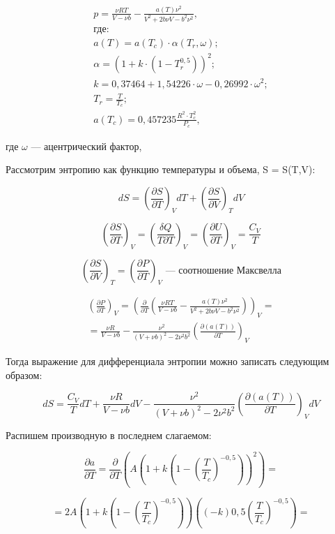 \documentclass[a4paper,14pt]{article}
\theoremstyle{plain} %
\theoremstyle{definition} %
\theoremstyle{remark} %
\begin{document}
\begin{gather*}
	p = \frac{\nu R T}{V - \nu b} - \frac{a(T) \nu^2}{V^2 + 2 b \nu V - b^2 \nu^2}, \\
	\textrm{где:} \\
	a(T) = a (T_c) \cdot \alpha(T_r, \omega);\\
	\alpha = (1 + k \cdot (1 - T_r^{0,5}))^2;\\
	k = 0,37464 + 1,54226 \cdot \omega - 0,26992 \cdot \omega^2;\\
	T_r = \frac{T}{T_c};\\
	a(T_c) = 0,457235 \frac{R^2 \cdot T_c^2}{P_c},
\end{gather*}

где $\omega$ --- ацентрический фактор, 

Рассмотрим энтропию как функцию температуры и объема,  S = S(T,V):

$$ d S = \left(\frac{\partial S}{\partial T}\right)_V d T + \left(\frac{\partial S}{\partial V}\right)_T d V $$

$$ \left(\frac{\partial S}{\partial T}\right)_V = \left(\frac{\delta Q}{T \partial T}\right)_V = \left(\frac{\partial U}{\partial T}\right)_V = \frac{C_V}{T} $$

$$ \left(\frac{\partial S}{\partial V}\right)_T = \left(\frac{\partial P}{\partial T}\right)_V \textrm{ --- соотношение Максвелла} $$

\begin{gather*}
\left(\frac{\partial P}{\partial T}\right)_V = \left(\frac{\partial}{\partial T}\left(\frac{\nu R T}{V - \nu b} - \frac{a(T) \nu^2}{V^2 + 2 b \nu V - b^2 \nu^2}\right)\right)_V = \\
= \frac{\nu R}{V - \nu b} - \frac{\nu^2}{(V + \nu b)^2 - 2 \nu^2 b^2} \left( \frac{\partial( a(T))}{\partial T} \right)_V
\end{gather*} 

Тогда выражение для дифференциала энтропии можно записать следующим образом:

$$ d S = \frac{C_V}{T} d T + \frac{\nu R}{V - \nu b} d V - \frac{\nu^2}{(V + \nu b)^2 - 2 \nu^2 b^2} \left( \frac{\partial( a(T))}{\partial T} \right)_V d V $$

Распишем производную в последнем слагаемом:

$$ \frac{\partial a}{\partial T} = \frac{\partial}{\partial T} \left( A \left(1 + k \left(1 - \left( \frac{T}{T_c} \right)^{-0,5}\right)\right)^2 \right) = $$

$$ = 2 A \left(1 + k \left(1 - \left( \frac{T}{T_c} \right)^{-0,5}\right)\right) \left( (- k) 0,5 \left( \frac{T}{T_c} \right)^{-0,5}  \right) = $$
\end{document}
